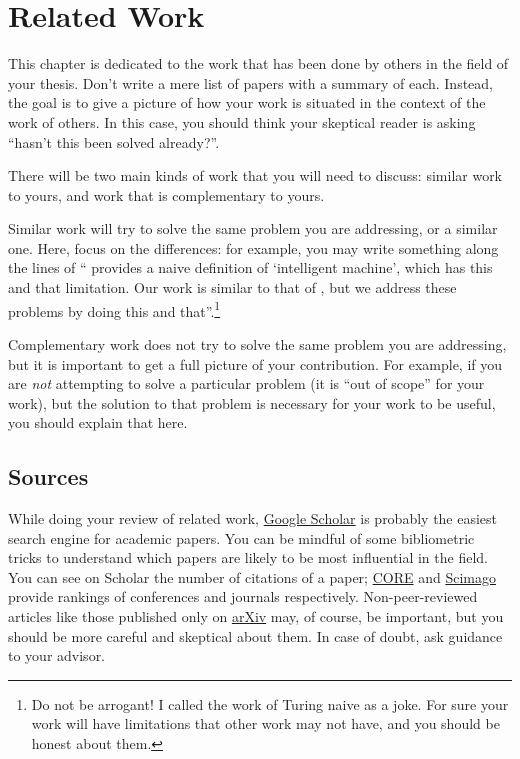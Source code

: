 \chapter{Related Work}
\label{sec:related}

This chapter is dedicated to the work that has been done by others in the field of your thesis.
Don't write a mere list of papers with a summary of each. Instead, the goal is to give a picture
of how your work is situated in the context of the work of others. In this case, you should
think your skeptical reader is asking ``hasn't this been solved already?''.

There will be two main kinds of work that you will need to discuss: similar work
to yours, and work that is complementary to yours.

Similar work will try to solve the same problem you are addressing, or a similar one.
Here, focus on the differences: for example, you may write something along the
lines of ``\textcite{DBLP:journals/x/Turing50} provides a naive definition of
`intelligent machine', which has this and that limitation. Our work is similar to that of
\citeauthor{DBLP:journals/x/Turing50}, but we address these problems by doing this and
that''.\footnote{Do not be arrogant! I called the work of Turing naive as a joke.
For sure your work will have limitations that other work may not have, and you should be honest about them.}

Complementary work does not try to solve the same problem you are addressing, but it is
important to get a full picture of your contribution. For example, if you are
\emph{not} attempting to solve a particular problem (it is ``out of scope'' for your work),
but the solution to that problem is necessary for your work to be useful, you should explain
that here.

\section{Sources}

While doing your review of related work, \href{https://scholar.google.com}{Google Scholar}
is probably the easiest search engine for academic papers. You can be mindful of some
bibliometric tricks to understand which papers are likely to be most influential in the field.
You can see on Scholar the number of citations of a paper;
\href{https://portal.core.edu.au/conf-ranks/}{CORE} and
\href{https://www.scimagojr.com}{Scimago} provide rankings of conferences and journals
respectively. Non-peer-reviewed articles like those published only on
\href{https://arxiv.org}{arXiv} may, of course, be important, but you should be more careful
and skeptical about them. In case of doubt, ask guidance to your advisor.

